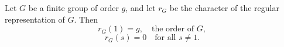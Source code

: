 Let $G$ be a finite group of order $g$, and let $r_G$ be the character of the regular representation of $G$. Then
$$r_G(1) = g, \quad \text{the order of } G,$$
$$r_G(s) = 0 \quad \text{for all } s \neq 1.$$